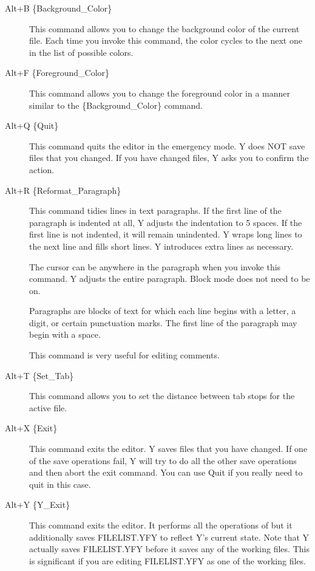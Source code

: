\begin{description}

\item[Alt+B \{Background\_Color\}] This command allows you to change the background color of the
  current file. Each time you invoke this command, the color cycles to the next one in the list
  of possible colors.

\item[Alt+F \{Foreground\_Color\}] This command allows you to change the foreground color in a
  manner similar to the \{Background\_Color\} command.

\item[Alt+Q \{Quit\}] This command quits the editor in the emergency mode. Y does NOT save files
  that you changed. If you have changed files, Y asks you to confirm the action.

\item[Alt+R \{Reformat\_Paragraph\}] This command tidies lines in text paragraphs. If the first
  line of the paragraph is indented at all, Y adjusts the indentation to 5 spaces. If the first
  line is not indented, it will remain unindented. Y wraps long lines to the next line and fills
  short lines. Y introduces extra lines as necessary.

  The cursor can be anywhere in the paragraph when you invoke this command. Y adjusts the entire
  paragraph. Block mode does not need to be on.

  Paragraphs are blocks of text for which each line begins with a letter, a digit, or certain
  punctuation marks. The first line of the paragraph may begin with a space.

  This command is very useful for editing comments.

\item[Alt+T \{Set\_Tab\}] This command allows you to set the distance between tab stops for the
  active file.

\item[Alt+X \{Exit\}] This command exits the editor. Y saves files that you have changed. If one
  of the save operations fail, Y will try to do all the other save operations and then abort the
  exit command. You can use Quit  if you really need to quit in this case.

\item[Alt+Y \{Y\_Exit\}] This command exits the editor. It performs all the operations of
   but it additionally saves FILELIST.YFY to reflect Y's current state. Note that Y
  actually saves FILELIST.YFY before it saves any of the working files. This is significant if
  you are editing FILELIST.YFY as one of the working files.

\end{description}

